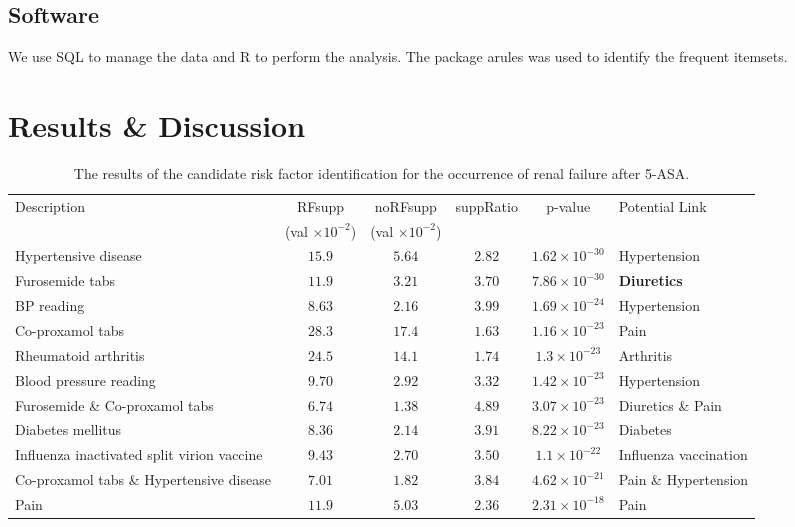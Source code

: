 \documentclass{llncs}
\begin{document}
\subsection{Software}
We use SQL to manage the data and R \cite{R} to perform the analysis. The package arules \cite{arules} was used to identify the frequent itemsets.
\newpage

\section{Results \& Discussion}
\begin{longtable}{>{\raggedright}p{2.8cm}ccccp{2.3cm}}
\caption{The results of the candidate risk factor identification for the occurrence of renal failure after 5-ASA.}
\label{rf} \\
Description & RFsupp& noRFsupp & suppRatio & p-value & Potential Link \\ 
& (val $\times 10^{-2} $)& (val $\times 10^{-2}$) & & & \\ \hline \hline \endfirsthead
Hypertensive disease & $15.9 $ & $5.64$ & $2.82$ & $1.62 \times 10^{-30}$ & Hypertension\\
Furosemide tabs & $11.9$ & $3.21 $ & $3.70$ & $7.86 \times 10^{-30}$ & \textbf{Diuretics} \cite{de20055} \\
BP reading & $8.63 $ & $2.16$ & $3.99$ & $1.69 \times 10^{-24}$ & Hypertension\\
Co-proxamol tabs & $28.3 $ & $17.4 $ & $1.63$ & $1.16 \times 10^{-23}$ & Pain \\
Rheumatoid arthritis & $24.5 $ & $14.1 $ & $1.74$ & $1.3 \times 10^{-23}$ & Arthritis\\
Blood pressure reading & $9.70$ & $2.92$ & $3.32$ & $1.42 \times 10^{-23}$ & Hypertension \\
Furosemide \& Co-proxamol tabs & $6.74$ & $1.38 $ & $4.89$ & $3.07 \times 10^{-23}$ & Diuretics \& Pain \\
Diabetes mellitus & $8.36 $ & $2.14$ & $3.91$ & $8.22 \times 10^{-23}$ & Diabetes \\
Influenza inactivated split virion vaccine & $9.43$ & $2.70 $ & $3.50$ & $1.1 \times 10^{-22}$ & Influenza vaccination \\
Co-proxamol tabs \& Hypertensive disease & $7.01$ & $1.82 $ & $3.84$ & $4.62 \times 10^{-21}$ & Pain \& Hypertension \\
Pain & $11.9$ & $5.03 $ & $2.36$ & $2.31 \times 10^{-18}$ & Pain \\

\end{longtable}
\end{document}
